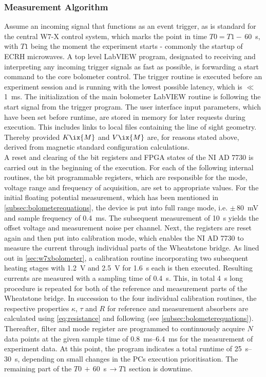         \subsubsection*{Measurement Algorithm}%
%
            Assume an incoming signal that functions as an event trigger, as is standard for the central W7-X control system, which marks the point in time $T0=T1-\,$\SI{60}{\second}, with $T1$ being the moment the experiment starts - commonly the startup of ECRH microwaves\cite{Spring2017}. A top level LabVIEW program, designated to receiving and interpreting any incoming trigger signals as fast as possible, is forwarding a start command to the core bolometer control. The trigger routine is executed before an experiment session and is running with the lowest possible latency, which is $\ll\,$\SI{1}{\milli\second}. The initialization of the main bolometer LabVIEW routine is following the start signal from the trigger program. The user interface input parameters, which have been set before runtime, are stored in memory for later requests during execution. This includes links to local files containing the line of sight geometry. Thereby provided $K\ix{M}$ and $V\ix{M}$ are, for reasons stated above, derived from magnetic standard configuration calculations.\\%
            A reset and clearing of the bit registers and FPGA states of the NI\textsuperscript{\textregistered} AD 7730 is carried out in the beginning of the execution. For each of the following internal routines, the bit programmable registers, which are responsible for the mode, voltage range and frequency of acquisition, are set to appropriate values. For the initial floating potential measurement, which has been mentioned in \cref{subsec:bolometerequations}, the device is put into full range mode, i.e. $\pm\,$\SI{80}{\milli\volt} and sample frequency of \SI{0.4}{\milli\second}. The subsequent measurement of \SI{10}{\second} yields the offset voltage and measurement noise per channel. Next, the registers are reset again and then put into calibration mode, which enables the NI\textsuperscript{\textregistered} AD 7730 to measure the current through individual parts of the Wheatstone bridge. As lined out in \cref{sec:w7xbolometer}, a calibration routine incorporating two subsequent heating stages with \SI{1.2}{\volt} and \SI{2.5}{\volt} for \SI{1.6}{\second} each is then executed. Resulting currents are measured with a sampling time of \SI{0.4}{\second}. This, in total \SI{4}{\second} long procedure is repeated for both of the reference and measurement parts of the Wheatstone bridge. In succession to the four individual calibration routines, the respective properties $\kappa$, $\tau$ and $R$ for reference and measurement absorbers are calculated using \cref{eq:resistance} and following (see \cref{subsec:bolometerequations}). Thereafter, filter and mode register are programmed to continuously acquire $N$ data points at the given sample time of \SIrange{0.8}{6.4}{\milli\second} for the measurement of experiment data. At this point, the program indicates a total runtime of \SIrange{25}{30}{\second}, depending on small changes in the PCs execution prioritisation. The remaining part of the $T0\,+\,$\SI{60}{\second}$\,\rightarrow T1$ section is downtime.\\%
